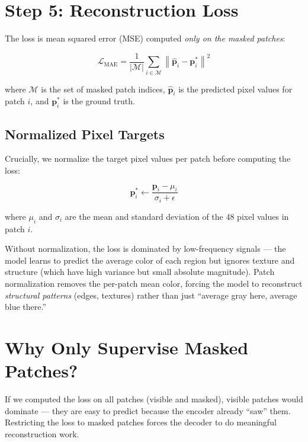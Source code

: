 \documentclass[12pt, a4paper]{report}
\newcommand{\norm}[1]{\left\lVert #1 \right\rVert}
\newcommand{\vect}[1]{\bm{#1}}
\begin{document}
\section{Step 5: Reconstruction Loss}

The loss is mean squared error (MSE) computed \emph{only on the masked patches}:

\begin{equation}
\mathcal{L}_{\text{MAE}} = \frac{1}{|\mathcal{M}|} \sum_{i \in \mathcal{M}} \norm{\hat{\vect{p}}_i - \vect{p}_i^*}^2
\end{equation}

where $\mathcal{M}$ is the set of masked patch indices, $\hat{\vect{p}}_i$ is the predicted pixel values for patch $i$, and $\vect{p}_i^*$ is the ground truth.

\subsection{Normalized Pixel Targets}

Crucially, we normalize the target pixel values per patch before computing the loss:

\begin{equation}
\vect{p}_i^* \leftarrow \frac{\vect{p}_i - \mu_i}{\sigma_i + \epsilon}
\end{equation}

where $\mu_i$ and $\sigma_i$ are the mean and standard deviation of the 48 pixel values in patch $i$.

\begin{intuitionbox}
Without normalization, the loss is dominated by low-frequency signals — the model learns to predict the average color of each region but ignores texture and structure (which have high variance but small absolute magnitude). Patch normalization removes the per-patch mean color, forcing the model to reconstruct \emph{structural patterns} (edges, textures) rather than just ``average gray here, average blue there.''
\end{intuitionbox}

\section{Why Only Supervise Masked Patches?}

If we computed the loss on all patches (visible and masked), visible patches would dominate — they are easy to predict because the encoder already ``saw'' them. Restricting the loss to masked patches forces the decoder to do meaningful reconstruction work.
\end{document}
